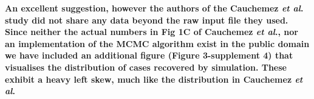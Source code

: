 \documentclass[11pt,oneside,letterpaper]{article}
\begin{document}
\textbf{An excellent suggestion, however the authors of the Cauchemez \textit{et al}. study did not share any data beyond the raw input file they used. Since neither the actual numbers in Fig 1C of Cauchemez \textit{et al}., nor an implementation of the MCMC algorithm exist in the public domain we have included an additional figure (Figure 3-supplement 4) that visualises the distribution of cases recovered by simulation. These exhibit a heavy left skew, much like the distribution in Cauchemez \textit{et al}.}

% 
\end{document}
